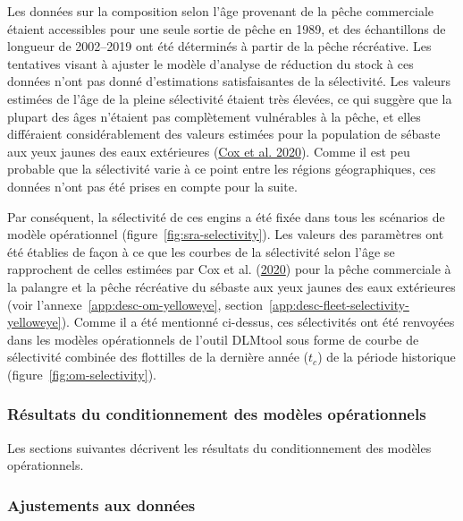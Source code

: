 \documentclass[french,11pt]{book}
\begin{document}
Les données sur la composition selon l'âge provenant de la pêche commerciale étaient accessibles pour une seule sortie de pêche en 1989, et des échantillons de longueur de 2002--2019 ont été déterminés à partir de la pêche récréative. Les tentatives visant à ajuster le modèle d'analyse de réduction du stock à ces données n'ont pas donné d'estimations satisfaisantes de la sélectivité. Les valeurs estimées de l'âge de la pleine sélectivité étaient très élevées, ce qui suggère que la plupart des âges n'étaient pas complètement vulnérables à la pêche, et elles différaient considérablement des valeurs estimées pour la population de sébaste aux yeux jaunes des eaux extérieures (\protect\hyperlink{ref-cox2020}{Cox et al. 2020}). Comme il est peu probable que la sélectivité varie à ce point entre les régions géographiques, ces données n'ont pas été prises en compte pour la suite.

Par conséquent, la sélectivité de ces engins a été fixée dans tous les scénarios de modèle opérationnel (figure~\ref{fig:sra-selectivity}). Les valeurs des paramètres ont été établies de façon à ce que les courbes de la sélectivité selon l'âge se rapprochent de celles estimées par Cox et al. (\protect\hyperlink{ref-cox2020}{2020}) pour la pêche commerciale à la palangre et la pêche récréative du sébaste aux yeux jaunes des eaux extérieures (voir l'annexe~\ref{app:desc-om-yelloweye}, section~\ref{app:desc-fleet-selectivity-yelloweye}). Comme il a été mentionné ci-dessus, ces sélectivités ont été renvoyées dans les modèles opérationnels de l'outil DLMtool sous forme de courbe de sélectivité combinée des flottilles de la dernière année (\(t_c\)) de la période historique (figure~\ref{fig:om-selectivity}).

\hypertarget{sec:approach3-conditioning-results}{%
\subsubsection{Résultats du conditionnement des modèles opérationnels}\label{sec:approach3-conditioning-results}}

Les sections suivantes décrivent les résultats du conditionnement des modèles opérationnels.

\hypertarget{sec:approach3-conditioning-indices}{%
\subsubsection{Ajustements aux données}\label{sec:approach3-conditioning-indices}}
\end{document}
